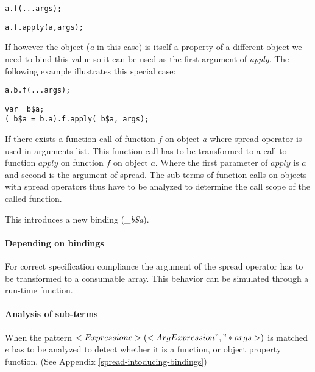 \begin{lstlisting}
a.f(...args);
\end{lstlisting}
\begin{lstlisting}[caption={apply function with correct $this$ scope}]
a.f.apply(a,args);
\end{lstlisting}

If however the object (\textit{a} in this case) is itself a property of a different object we need to bind this value so it can be used as the first argument of \textit{apply}. The following example illustrates this special case:

\begin{minipage}{0.45\textwidth}
\begin{lstlisting}
a.b.f(...args);
\end{lstlisting}
\end{minipage}
\hfill
\begin{minipage}{0.45\textwidth}
\begin{lstlisting}
var _b$a;
(_b$a = b.a).f.apply(_b$a, args);
\end{lstlisting}
\end{minipage}

If there exists a function call of function $f$ on object $a$ where spread operator is used in arguments list. This function call has to be transformed to a call to function $apply$ on function $f$ on object $a$. Where the first parameter of $apply$ is $a$ and second is the argument of spread. The sub-terms of function calls on objects with spread operators thus have to be analyzed to determine the call scope of the called function.

This introduces a new binding (\textit{\_b\$a}).

\paragraph{Depending on bindings}
For correct specification compliance the argument of the spread operator has to be transformed to a consumable array. This behavior can be simulated through a run-time function.

\paragraph{Analysis of sub-terms} \label{spread-analysis-sub-terms}
When the pattern $<Expression e>(<{ArgExpression ","}* args>)$ is matched $e$ has to be analyzed to detect whether it is a function, or object property function. (See Appendix \ref{spread-intoducing-bindings})

